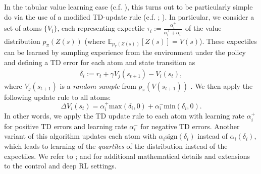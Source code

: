 In the tabular value learning case (c.f. ), this turns out to be particularly simple do via the use of a modified TD-update rule (c.f. ; \citealp{lowet2020distributional}).
In particular, we consider a set of atoms $\{ V_i \}$, each representing expectile $\tau_i := \frac{\alpha_i^+}{\alpha_i^+ + \alpha_i^-}$ of the value distribution $p_\pi(Z(s))$ (where $\mathbb{E}_{ p_\pi(Z(s))} \left [ Z(s) \right ] = V(s)$).
These expectiles can be learned by sampling experience from the environment under the policy and defining a TD error for each atom and state transition as
\begin{align}
    \delta_i := r_t + \gamma V_j(s_{t+1}) - V_i(s_t),
\end{align}
where $V_j(s_{t+1})$ is a \emph{random sample} from  $p_\pi(V(s_{t+1}))$ \citep{lowet2020distributional,dabney2020distributional}.
We then apply the following update rule to all atoms:
\begin{equation}
    \label{eq:DRL_V_expec}
    \Delta V_i(s_t) = \alpha_i^+ \text{max}(\delta_i, 0 ) + \alpha_i^- \text{min}(\delta_i, 0).
\end{equation}
In other words, we apply the TD update rule to each atom with learning rate $\alpha_i^+$ for positive TD errors and learning rate $\alpha_i^-$ for negative TD errors.
Another variant of this algorithm updates each atom with $\alpha_i \text{sign}(\delta_i)$ instead of $\alpha_i (\delta_i)$, which leads to learning of the \emph{quartiles} of the distribution instead of the expectiles.
We refer to \citet{bellemare2017distributional,dabney2018distributional,rowland2019statistics,bellemare2023distributional}; and \citet{dabney2020distributional} for additional mathematical details and extensions to the control and deep RL settings.

